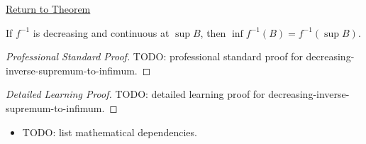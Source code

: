 \newpage
{}
\label{prf:decreasing-inverse-supremum-to-infimum}

\begin{remark*}[Return]
\hyperref[thm:decreasing-inverse-supremum-to-infimum]{Return to Theorem}
\end{remark*}

\begin{theorem*}
If $f^{-1}$ is decreasing and continuous at $\sup B$, then
$\inf f^{-1}(B)=f^{-1}(\sup B)$.
\end{theorem*}

\begin{proof}[Professional Standard Proof]
\LRAProofBodyStart
TODO: professional standard proof for decreasing-inverse-supremum-to-infimum.
\end{proof}

\begin{proof}[Detailed Learning Proof]
\LRAProofBodyStart
TODO: detailed learning proof for decreasing-inverse-supremum-to-infimum.
\end{proof}

\begin{remark*}
\end{remark*}

\begin{dependencies}
\begin{itemize}
  \item TODO: list mathematical dependencies.
\end{itemize}
\end{dependencies}

\clearpage
